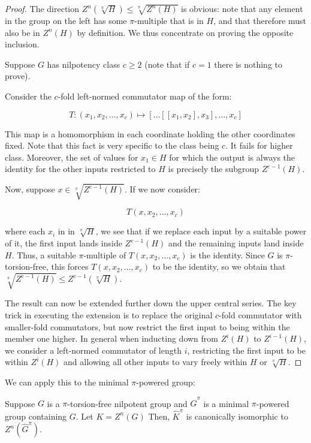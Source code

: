 \documentclass{ucetd}
\begin{document}
\begin{proof}
  The direction $Z^n(\sqrt[\pi]{H}) \le \sqrt[\pi]{Z^n(H)}$ is
  obvious: note that any element in the group on the left has some
  $\pi$-multiple that is in $H$, and that therefore must also be in
  $Z^n(H)$ by definition. We thus concentrate on proving the opposite
  inclusion.

  Suppose $G$ has nilpotency class $c \ge 2$ (note that if $c = 1$
  there is nothing to prove).

  Consider the $c$-fold left-normed commutator map of the form:

  $$T:(x_1,x_2,\dots,x_c) \mapsto [\dots [[x_1,x_2],x_3],\dots,x_c]$$

  This map is a homomorphism in each coordinate holding the other
  coordinates fixed. Note that this fact is very specific to the class
  being $c$. It fails for higher class. Moreover, the set of values
  for $x_1 \in H$ for which the output is always the identity for the other
  inputs restricted to $H$ is precisely the subgroup $Z^{c-1}(H)$.

  Now, suppose $x \in \sqrt[\pi]{Z^{c-1}(H)}$. If we now consider:

  $$T(x,x_2,\dots,x_c)$$

  where each $x_i$ in in $\sqrt[\pi]{H}$, we see that if we replace
  each input by a suitable power of it, the first input lands inside
  $Z^{c-1}(H)$ and the remaining inputs land inside $H$. Thus, a
  suitable $\pi$-multiple of $T(x,x_2,\dots,x_c)$ is the
  identity. Since $G$ is $\pi$-torsion-free, this forces
  $T(x,x_2,\dots,x_c)$ to be the identity, so we obtain that
  $\sqrt[\pi]{Z^{c-1}(H)} \le Z^{c-1}(\sqrt[\pi]{H})$.

  The result can now be extended further down the upper central
  series. The key trick in executing the extension is to replace the
  original $c$-fold commutator with smaller-fold commutators, but now
  restrict the first input to being within the member one higher. In
  general when inducting down from $Z^i(H)$ to $Z^{i-1}(H)$, we
  consider a left-normed commutator of length $i$, restricting the
  first input to be within $Z^i(H)$ and allowing all other inputs to
  vary freely within $H$ or $\sqrt[\pi]{H}$.  
\end{proof}

We can apply this to the minimal $\pi$-powered group:

\begin{lemma}
  Suppose $G$ is a $\pi$-torsion-free nilpotent group and
  $\hat{G}^\pi$ is a minimal $\pi$-powered group containing $G$. Let
  $K = Z^n(G)$ Then, $\hat{K}^{\pi}$ is canonically isomorphic to
  $Z^n(\hat{G}^{\pi})$.
\end{lemma}
\end{document}

